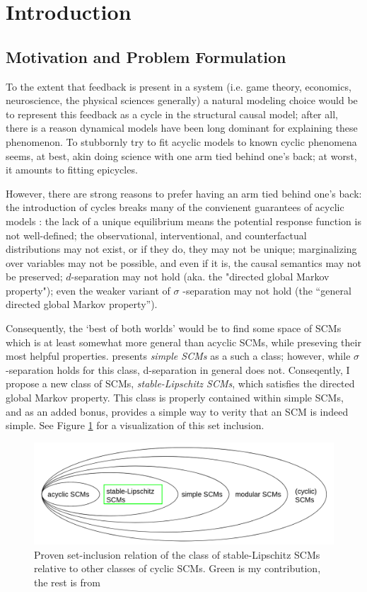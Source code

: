 \documentclass[12pt]{article}
\begin{document}
\section{Introduction}
\subsection{Motivation and Problem Formulation}

To the extent that feedback is present in a system (i.e. game theory, economics, neuroscience, the physical sciences generally) a natural modeling choice would be to represent this feedback as a cycle in the structural causal model; after all, there is a reason dynamical models have been long dominant for explaining these phenomenon.
To stubbornly try to fit acyclic models to known cyclic phenomena seems, at best, akin doing science with one arm tied behind one's back; at worst, it amounts to fitting epicycles.

However, there are strong reasons to prefer having an arm tied behind one's back: the introduction of cycles breaks many of the convienent guarantees of acyclic models \cite{Foundations}: the lack of a unique equilibrium means the potential response function is not well-defined; the observational, interventional, and counterfactual distributions may not exist, or if they do, they may not be unique; marginalizing over variables may not be possible, and even if it is, the causal semantics may not be preserved; $d$-separation may not hold (aka. the "directed global Markov property"); even the weaker variant of $\sigma$ -separation may not hold (the “general directed global Markov property”).

Consequently, the `best of both worlds' would be to find some space of SCMs which is at least somewhat more general than acyclic SCMs, while preseving their most helpful properties. \cite{Foundations} presents \emph{simple SCMs} as a such a class; however, while $\sigma$ -separation holds for this class, d-separation in general does not. Conseqently, I propose a new class of SCMs, \emph{stable-Lipschitz SCMs}, which satisfies the directed global Markov property.
This class is properly contained within simple SCMs, and as an added bonus, provides a simple way to verity that an SCM is indeed simple. See Figure \ref{fig:set-inclusion} for a visualization of this set inclusion.

\begin{figure}
\centering
\includegraphics[width=.6\linewidth]{pics/my_own/set_inclusion.png}
\caption{Proven set-inclusion relation of the class of stable-Lipschitz SCMs relative to other classes of cyclic SCMs. Green is my contribution, the rest is from \cite{Foundations}}
\label{fig:set-inclusion}
\end{figure}
\end{document}
